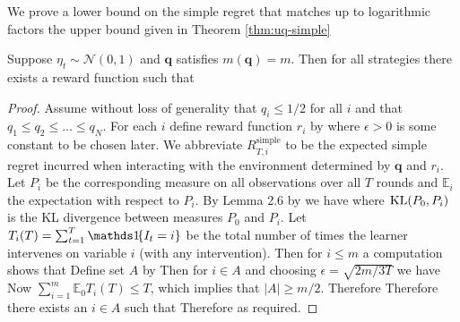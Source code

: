 
We prove a lower bound on the simple regret that matches up to logarithmic factors the upper bound given in Theorem \ref{thm:uq-simple}

\begin{theorem}\label{thm:lower}
Suppose $\eta_t \sim \mathcal N(0, 1)$ and $\boldsymbol{q}$ satisfies $m(\boldsymbol{q}) = m$.
Then for all strategies there exists a reward function such that
\end{theorem}

\begin{proof}
Assume without loss of generality that $q_i \leq 1/2$ for all $i$ and that $q_1 \leq q_2 \leq \ldots \leq q_N$.
For each $i$ define reward function $r_i$ by
where $\epsilon > 0$ is some constant to be chosen later.
We abbreviate $R_{T,i}^{\text{simple}}$ to be the expected simple regret incurred when interacting with the
environment determined by $\boldsymbol{q}$ and $r_i$. Let $P_i$ be the corresponding measure
on all observations over all $T$ rounds and $\mathbb E_i$ the expectation with respect to $P_i$. By Lemma 2.6 by \cite{Tsy08} we have
where $\operatorname{KL}(P_0, P_i)$ is the KL divergence between measures $P_0$ and $P_i$.
Let $T_i(T) = \sum_{t=1}^T \ind{I_t = i}$ be the total number of times the learner intervenes on variable $i$ (with any intervention). 
Then for $i \leq m$ a computation shows that 
Define set $A$ by
Then for $i \in A$ and choosing $\epsilon = \sqrt{2m/3T}$ we have
Now $\sum_{i=1}^m \mathbb E_0 T_i(T) \leq T$, which implies that $|A| \geq m/2$.
Therefore
Therefore there exists an $i \in A$ such that
Therefore
as required.
\end{proof}

